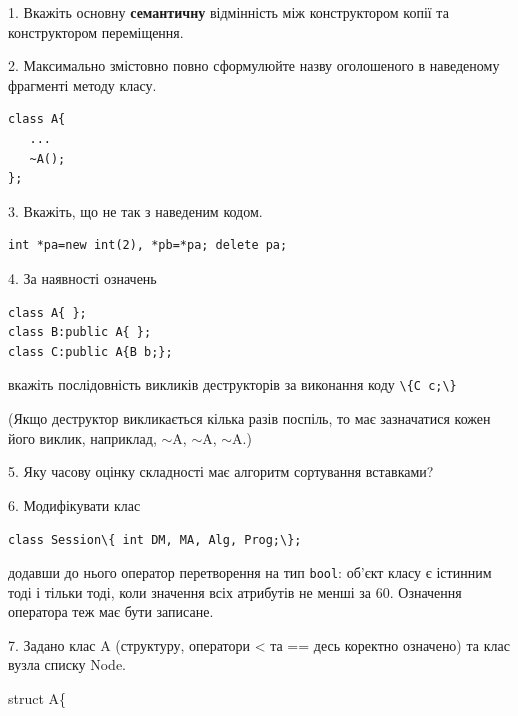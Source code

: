 \documentclass[12pt, ukrainian]{article}
\def\code#1{\Verb!#1!}
\begin{document}
{%
1. Вкажіть основну \textbf{семантичну} відмінність між конструктором копії та конструктором переміщення.%
\par
\vspace{2mm}
2. Максимально змістовно повно сформулюйте назву оголошеного в наведеному фрагменті методу класу.
\vspace{-3mm}
\begin{verbatim}class A{
   ...
   ~A();
};\end{verbatim}
\vspace{-3mm}
\par
\vspace{2mm}
3. Вкажіть, що не так з наведеним кодом.
\vspace{-3mm}
\begin{verbatim}int *pa=new int(2), *pb=*pa; delete pa;\end{verbatim}
\vspace{-3mm}
\par
\vspace{2mm}
4. За наявності означень
\vspace{-3mm}
\begin{verbatim}
class A{ };
class B:public A{ };
class C:public A{B b;};\end{verbatim}
\vspace{-3mm}
вкажіть послідовність викликів деструкторів за виконання коду \code{\{C c;\}} 

(Якщо деструктор викликається кілька разів поспіль, то має зазначатися кожен його виклик, наприклад, $\sim$A, $\sim$A, $\sim$A.)

\vspace{2mm}
5. Яку часову оцінку складності має алгоритм сортування вставками?
\par
\vspace{2mm}
6. Модифікувати клас 

\qquad\code{class Session\{ int DM, MA, Alg, Prog;\};} 


додавши до нього оператор перетворення на тип \code{bool}: об'єкт класу є істинним тоді і тільки тоді, коли значення всіх атрибутів не менші за 60. Означення оператора теж має бути записане.%
\par
\vspace{2mm}
7. 
Задано клас A (структуру, оператори < та == десь коректно означено) та клас вузла списку Node.

struct A\{

}
\end{document}
